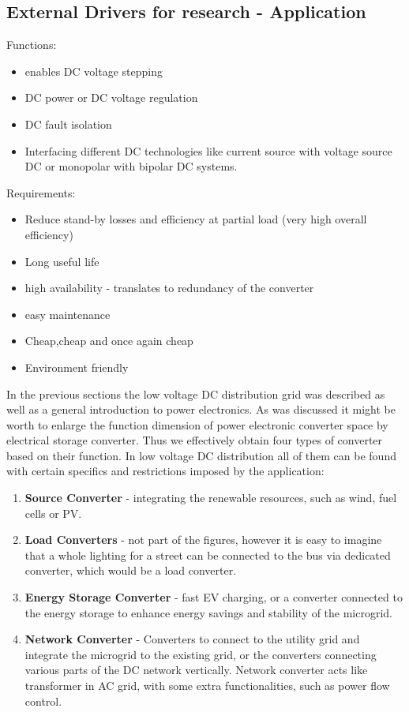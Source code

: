 \documentclass[]{scrartcl}
\begin{document}
	
	

\subsection{External Drivers for research - Application}
Functions: 
\begin{itemize}
	\item enables DC voltage stepping
	\item DC power or DC voltage regulation
	\item DC fault isolation
	\item Interfacing different DC technologies like current source with voltage source DC or monopolar with bipolar DC systems.
\end{itemize}

Requirements:
\begin{itemize}
	\item Reduce stand-by losses and efficiency at partial load (very high overall efficiency)
	\item Long useful life
	\item high availability  - translates to redundancy of the converter
	\item easy maintenance
	\item Cheap,cheap and once again cheap
	\item Environment friendly 
\end{itemize}



In the previous sections the low voltage DC distribution grid was described as well as a general introduction to power electronics. As was discussed it might be worth to enlarge the function dimension of power electronic converter space by electrical storage converter. Thus we effectively obtain four types of converter based on their function. In low voltage DC distribution all of them can be found with certain specifics and restrictions imposed by the application:

\begin{enumerate}
	\item \textbf{Source Converter }- integrating the renewable resources, such as wind, fuel cells or PV. 
	\item \textbf{Load Converters} - not part of the figures, however it is easy to imagine that a whole lighting for a street can be connected to the bus via dedicated converter, which would be a load converter. 
	\item \textbf{Energy Storage Converter } - fast EV charging, or a converter connected to the energy storage to enhance energy savings and stability of the microgrid.
	\item \textbf{Network Converter} - Converters to connect to the utility grid and integrate the microgrid to the existing grid, or the converters connecting various parts of the DC network vertically. Network converter acts like transformer in AC grid, with some extra functionalities, such as power flow control.
	
	\end{enumerate}
	\newpage
\end{document}
